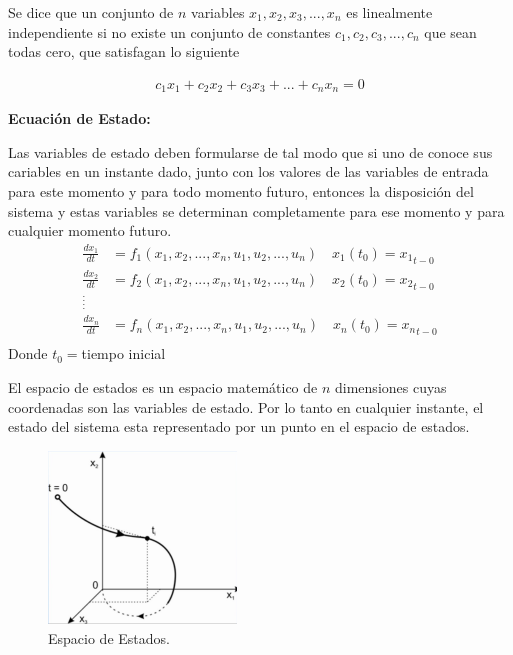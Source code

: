 \documentclass[12pt]{article}
\begin{document}
Se dice que un conjunto de $n$ variables $x_{1},x_{2},x_{3},...,x_{n}$ es linealmente independiente si no existe un conjunto de constantes $c_{1},c_{2},c_{3},...,c_{n}$ que sean todas cero, que satisfagan lo siguiente

\begin{equation}
    \begin{split}
        c_{1}x_{1}+c_{2}x_{2}+c_{3}x_{3}+...+c_{n}x_{n}=0
    \end{split}
    \label{eq:lin_indepen}
\end{equation}

\textbf{Ecuación de Estado:}
\vspace{5mm}

Las variables de estado deben formularse de tal modo que si uno de conoce sus cariables en un instante dado, junto con los valores de las variables de entrada para este momento y para todo momento futuro, entonces la disposición del sistema y estas variables se determinan completamente para ese momento y para cualquier momento futuro.
\begin{equation}
    \begin{split}
        \frac{dx_{1}}{dt}&=f_{1}(x_{1},x_{2},...,x_{n},u_{1},u_{2},...,u_{n}) \quad x_{1}(t_{0})={x_{1}}_{t-0}\\
        \frac{dx_{2}}{dt}&=f_{2}(x_{1},x_{2},...,x_{n},u_{1},u_{2},...,u_{n}) \quad x_{2}(t_{0})={x_{2}}_{t-0}\\
        _:^:\\
        \frac{dx_{n}}{dt}&=f_{n}(x_{1},x_{2},...,x_{n},u_{1},u_{2},...,u_{n}) \quad x_{n}(t_{0})={x_{n}}_{t-0}\\
    \end{split}
    \label{eq:state_eq}
\end{equation}
Donde $t_{0}=$tiempo inicial
\vspace{5mm}

El espacio de estados es un espacio matemático de $n$ dimensiones cuyas coordenadas son las variables de estado. Por lo tanto en cualquier instante, el estado del sistema esta representado por un punto en el espacio de estados.
\begin{figure}[h]
    \centering
        \includegraphics[width=5cm]{IMAGENES/estados}
        \caption{Espacio de Estados.}
\end{figure}
\end{document}
